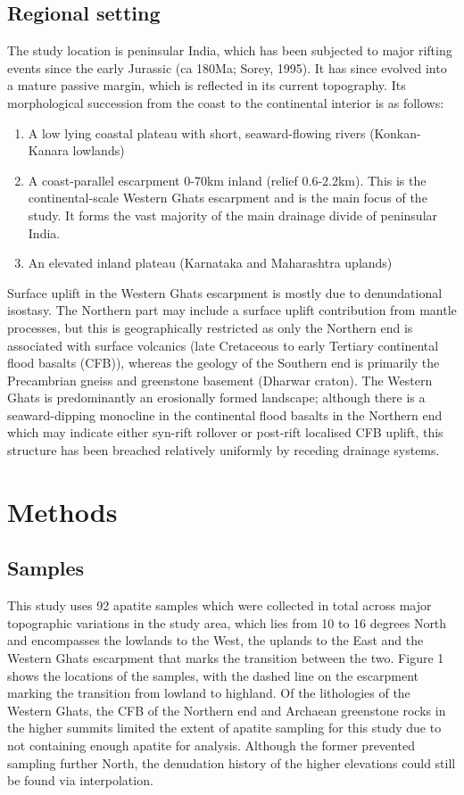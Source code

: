 \documentclass[11pt, oneside]{article}   	%
\begin{document}
\subsection{Regional setting}
The study location is peninsular India, which has been subjected to major rifting events since the early Jurassic (ca 180Ma; Sorey, 1995).
It has since evolved into a mature passive margin, which is reflected in its current topography. Its morphological succession from the coast to the continental interior is as follows:
\begin{enumerate}
        \item A low lying coastal plateau with short, seaward-flowing rivers (Konkan-Kanara lowlands)
        \item A coast-parallel escarpment 0-70km inland (relief 0.6-2.2km). This is the continental-scale Western Ghats escarpment and is the main focus of the study. It forms the vast majority of the main drainage divide of peninsular India.
        \item An elevated inland plateau (Karnataka and Maharashtra uplands)
\end{enumerate}
Surface uplift in the Western Ghats escarpment is mostly due to denundational isostasy. The Northern part may include a surface uplift contribution from mantle processes, but this is geographically restricted as only the Northern end is associated with surface volcanics (late Cretaceous to early Tertiary continental flood basalts (CFB)), whereas the geology of the Southern end is primarily the Precambrian gneiss and greenstone basement (Dharwar craton). 
The Western Ghats is predominantly an erosionally formed landscape; although there is a seaward-dipping monocline in the continental flood basalts in the Northern end which may indicate either syn-rift rollover or post-rift localised CFB uplift, this structure has been breached relatively uniformly by receding drainage systems.
\section{Methods}
\subsection{Samples}
This study uses 92 apatite samples which were collected in total across major topographic variations in the study area, which lies from 10 to 16 degrees North and encompasses the lowlands to the West, the uplands to the East and the Western Ghats escarpment that marks the transition between the two. Figure 1 shows the locations of the samples, with the dashed line on the escarpment marking the transition from lowland to highland. Of the lithologies of the Western Ghats, the CFB of the Northern end and Archaean greenstone rocks in the higher summits limited the extent of apatite sampling for this study due to not containing enough apatite for analysis. Although the former prevented sampling further North, the denudation history of the higher elevations could still be found via interpolation. 
\end{document}
